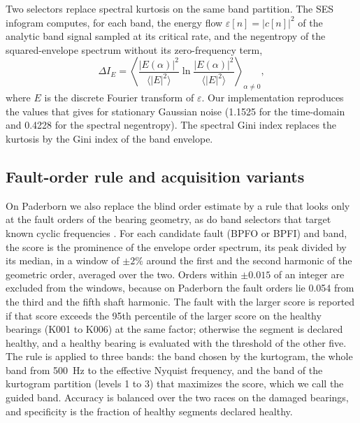 Two selectors replace spectral kurtosis on the same band partition. The SES infogram
\citep{antoni2016infogram} computes, for each band, the energy flow $\varepsilon[n] = |c[n]|^2$ of
the analytic band signal sampled at its critical rate, and the negentropy of the squared-envelope
spectrum without its zero-frequency term,
\begin{equation}
  \Delta I_E = \left\langle \frac{|E(\alpha)|^2}{\langle |E|^2\rangle}
  \ln\frac{|E(\alpha)|^2}{\langle |E|^2\rangle} \right\rangle_{\alpha \neq 0},
\end{equation}
where $E$ is the discrete Fourier transform of $\varepsilon$. Our implementation reproduces the
values that \citet{antoni2016infogram} gives for stationary Gaussian noise (1.1525 for the
time-domain and 0.4228 for the spectral negentropy). The spectral Gini index
\citep{hebdasobkowicz2020nongaussian} replaces the kurtosis by the Gini index of the band envelope.

\subsection{Fault-order rule and acquisition variants}
\label{sec:met-rule}

On Paderborn we also replace the blind order estimate by a rule that looks only at the fault
orders of the bearing geometry, as do band selectors that target known cyclic frequencies
\citep{smith2019demodband,mauricio2020iesfogram,schmidt2020ifbigram}. For each candidate fault
(BPFO or BPFI) and band, the score is the prominence of the envelope order spectrum, its peak
divided by its median, in a window of $\pm2\%$ around the first and the second harmonic of the
geometric order, averaged over the two. Orders within $\pm0.015$ of an integer are excluded from the
windows, because on Paderborn the fault orders lie 0.054 from the third and the fifth shaft
harmonic. The fault with the larger score is reported if that score exceeds the 95th percentile of
the larger score on the healthy bearings (K001 to K006) at the same factor; otherwise the segment is
declared healthy, and a healthy bearing is evaluated with the threshold of the other five. The rule
is applied to three bands: the band chosen by the kurtogram, the whole band from 500~Hz to the
effective Nyquist frequency, and the band of the kurtogram partition (levels 1 to 3) that maximizes
the score, which we call the guided band. Accuracy is balanced over the two races on the damaged
bearings, and specificity is the fraction of healthy segments declared healthy.

